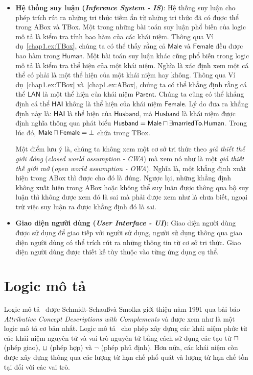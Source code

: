 \begin{itemize}
  \item \textbf{Hệ thống suy luận ({\em Inference System - IS})}: Hệ thống suy luận cho phép trích rút ra những tri thức tiềm ẩn từ những tri thức đã có được thể trong ABox và TBox. Một trong những bài toán suy luận phổ biến của logic mô tả là kiểm tra tính bao hàm của các khái niệm. Thông qua Ví dụ~\ref{chap1.ex:TBox}, chúng ta có thể thấy rằng cả $\mathsf{Male}$ và $\mathsf{Female}$ đều được bao hàm trong $\mathsf{Human}$. Một bài toán suy luận khác cũng phổ biến trong logic mô tả là kiểm tra thể hiện của một khái niệm. Nghĩa là xác định xem một cá thể có phải là một thể hiện của một khái niệm hay không. Thông qua Ví dụ~\ref{chap1.ex:TBox} và~\ref{chap1.ex:ABox}, chúng ta có thể khẳng định rằng cá thể $\mathsf{LAN}$ là một thể hiện của khái niệm $\mathsf{Parent}$. Chúng ta cũng có thể khẳng định cá thể $\mathsf{HAI}$ không là thể hiện của khái niệm $\mathsf{Female}$. Lý do đưa ra khẳng định này là: $\mathsf{HAI}$ là thể hiện của $\mathsf{Husband}$, mà $\mathsf{Husband}$ là khái niệm được định nghĩa thông qua phát biểu $\mathsf{Husband = Male \sqcap \exists marriedTo.Human}$. Trong lúc đó, $\mathsf{Male \sqcap Female = \bot}$ chứa trong TBox.

Một điểm lưu ý là, chúng ta không xem một cơ sở tri thức theo {\em giả thiết thế giới đóng} ({\em closed world assumption - CWA}) mà xem nó như là một {\em giả thiết thế giới mở} ({\em open world assumption - OWA}). Nghĩa là, một khẳng định xuất hiện trong ABox thì được cho đó là đúng. Ngược lại, những khẳng định không xuất hiện trong ABox hoặc không thể suy luận được thông qua bộ suy luận thì không được xem đó là sai mà phải được xem như là chưa biết, ngoại trừ việc suy luận ra được khẳng định đó là sai.

  \item \textbf{Giao diện người dùng ({\em User Interface - UI})}: Giao diện người dùng được sử dụng để giao tiếp với người sử dụng, người sử dụng thông qua giao diện người dùng có thể trích rút ra những thông tin từ cơ sở tri thức. Giao diện người dùng được thiết kế tùy thuộc vào từng ứng dụng cụ thể.
\end{itemize}

\section{Logic mô tả \ALC}
Logic mô tả \ALC\ được Schmidt-Schau\ss và Smolka giới thiệu năm 1991 qua bài báo {\em Attributive Concept Descriptions with Complements} và được xem như là một logic mô tả cơ bản nhất. Logic mô tả \ALC\ cho phép xây dựng các khái niệm phức từ các khái niệm nguyên tử và vai trò nguyên tử bằng cách sử dụng các tạo tử $\sqcap$ (phép giao), $\sqcup$ (phép hợp) và $\neg$ (phép phủ định). Hơn nữa, các khái niệm còn được xây dựng thông qua các lượng từ hạn chế phổ quát và lượng từ hạn chế tồn tại đối với các vai trò.

